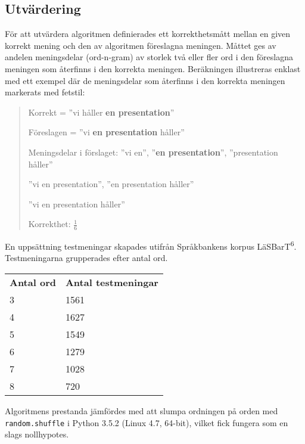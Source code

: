 \documentclass[a4paper,11pt]{article}
\begin{document}
\subsection*{Utvärdering}
För att utvärdera algoritmen definierades ett korrekthetsmått mellan
en given korrekt mening och den av algoritmen föreslagna meningen.
Måttet ges av andelen meningsdelar (ord-n-gram)
av storlek två eller fler ord i den föreslagna meningen som återfinns
i den korrekta meningen. Beräkningen illustreras enklast med ett exempel
där de meningsdelar som återfinns i den korrekta meningen markerats
med fetstil:

\begin{quote}
Korrekt = ''vi håller \textbf{en presentation}''

Föreslagen = ''vi \textbf{en presentation} håller''

Meningsdelar i förslaget: ''vi en'', ''\textbf{en presentation}'', ''presentation håller''

\hspace{4.2cm} ''vi en presentation'', ''en presentation håller''

\hspace{4.2cm} ''vi en presentation håller''

Korrekthet: $\displaystyle \frac{1}{6}$
\end{quote}

\vspace{0.25cm}
\noindent
En uppsättning testmeningar
skapades utifrån Språkbankens korpus LäSBarT\textsuperscript{6}. Testmeningarna
grupperades efter antal ord.

\begin{center}
\begin{tabular}{l l}
\textbf{Antal ord} & \textbf{Antal testmeningar}\\
3 & 1561\\
4 & 1627\\
5 & 1549\\
6 & 1279\\
7 & 1028\\
8 & 720\\
\end{tabular}
\end{center}

\noindent
Algoritmens prestanda jämfördes med att slumpa ordningen på orden med \texttt{random.shuffle}
i Python 3.5.2 (Linux 4.7, 64-bit), vilket fick fungera som en slags nollhypotes.

\vspace{0.25cm}
\noindent
\end{document}
